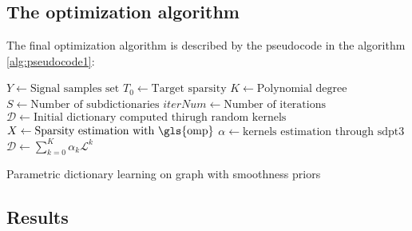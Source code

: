 \subsection{The optimization algorithm}
The final optimization algorithm is described by the pseudocode in the algorithm \ref{alg:pseudocode1}:
\begin{algorithm}[b]
  \begin{algorithmic}[1]
      \State $Y \gets \text{Signal samples set}$
      \State $T_0\gets \text{Target sparsity}$
      \State $K \gets \text{Polynomial degree}$
      \State $S \gets \text{Number of subdictionaries}$
      \State $iterNum \gets \text{Number of iterations}$
      \State $\mathcal{D} \gets \text{Initial dictionary computed thirugh random kernels}$
    \EndProcedure
        \State {}
        \State $X \gets \text{Sparsity estimation with \gls{omp}}$
      \EndProcedure
        $\alpha \gets \text{kernels estimation through sdpt3}$
      \EndProcedure
        \State $\mathcal{D} \gets \sum_{k=0}^K \alpha_k \mathcal{L}^k$
      \EndProcedure
    \EndFor
  \end{algorithmic}
  \caption{Parametric dictionary learning on graph with smoothness priors}
  \label{alg:pseudocode1}
\end{algorithm}

\subsection{Results}
\label{sec:dataGen}
